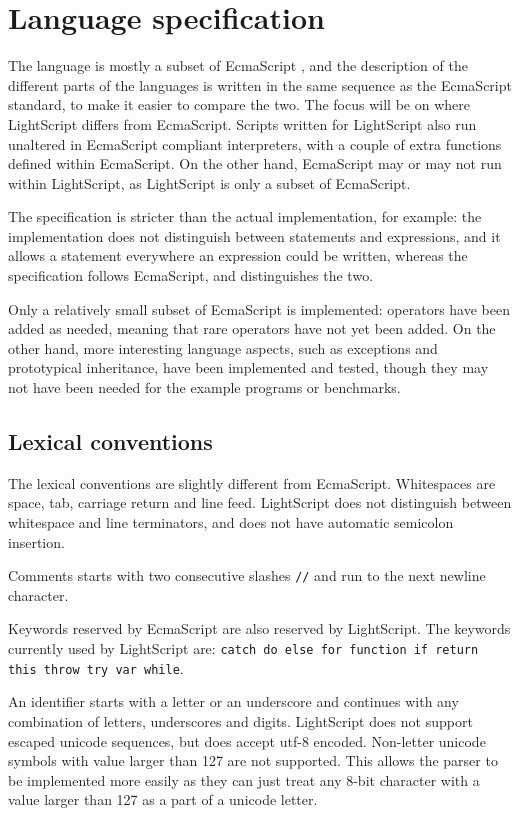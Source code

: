 \documentclass[11pt]{report}
\begin{document}
\section{Language specification}
The language is mostly a subset of EcmaScript \cite{ecma-262}, and the description of the different parts of the languages is written in the same sequence as the EcmaScript standard, to make it easier to compare the two. The focus will be on where LightScript differs from EcmaScript.
Scripts written for LightScript also run unaltered in EcmaScript compliant interpreters, with a couple of extra functions defined within EcmaScript. On the other hand, EcmaScript may or may not run within LightScript, as LightScript is only a subset of EcmaScript.

The specification is stricter than the actual implementation, for example: the implementation does not distinguish between statements and expressions, and it allows a statement everywhere an expression could be written, whereas the specification follows EcmaScript, and distinguishes the two.

Only a relatively small subset of EcmaScript is implemented: operators have been added as needed, meaning that rare operators have not yet been added. 
On the other hand, more interesting language aspects, such as exceptions and prototypical inheritance, have been implemented and tested, though they may not have been needed for the example programs or benchmarks.



\subsection{Lexical conventions}
The lexical conventions are slightly different from EcmaScript. 
Whitespaces are space, tab, carriage return and line feed. 
LightScript does not distinguish between whitespace and line terminators, and does not have automatic semicolon insertion.

Comments starts with two consecutive slashes \verb|//| and run to the next newline character.

Keywords reserved by EcmaScript are also reserved by LightScript. The keywords currently used by LightScript are: {\tt catch do else for function if return this throw try var while}. 

An identifier starts with a letter or an underscore and continues with any combination of letters, underscores and digits. 
LightScript does not support escaped unicode sequences, but does accept utf-8 encoded. Non-letter unicode symbols with value larger than 127 are not supported. This allows the parser to be implemented more easily as they can just treat any 8-bit character with a value larger than 127 as a part of a unicode letter.
\end{document}
